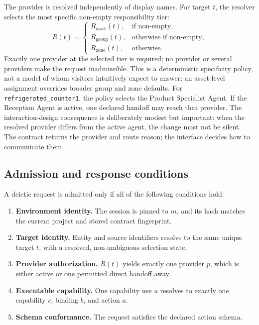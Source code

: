 The provider is resolved independently of display names.  For target \(t\), the
resolver selects the most specific non-empty responsibility tier:
\[
R(t) =
\begin{cases}
R_{\mathrm{asset}}(t), & \text{if non-empty},\\
R_{\mathrm{group}}(t), & \text{otherwise if non-empty},\\
R_{\mathrm{zone}}(t), & \text{otherwise}.
\end{cases}
\]
Exactly one provider at the selected tier is required; no provider or several
providers make the request inadmissible.  This is a deterministic specificity
policy, not a model of whom visitors intuitively expect to answer: an
asset-level assignment overrides broader group and zone defaults.  For
\texttt{refrigerated\_counter1}, the policy selects the Product Specialist
Agent.  If the Reception Agent is active, one declared handoff may reach that
provider.  The interaction-design consequence is deliberately modest but
important: when the resolved provider differs from the active agent, the change
must not be silent.  The contract returns the provider and route reason; the
interface decides how to communicate them.

\subsection{Admission and response conditions}

A deictic request is admitted only if all of the following conditions hold:

\begin{enumerate}
  \item \textbf{Environment identity.}  The session is pinned to \(m\), and its
  hash matches the current project and stored contract fingerprint.

  \item \textbf{Target identity.}  Entity and source identifiers resolve to the
  same unique target \(t\), with a resolved, non-ambiguous selection state.

  \item \textbf{Provider authorization.}  \(R(t)\) yields exactly one provider
  \(p\), which is either active or one permitted direct handoff away.

  \item \textbf{Executable capability.}  One capability use \(u\) resolves to
  exactly one capability \(c\), binding \(b\), and action \(a\).

  \item \textbf{Schema conformance.}  The request satisfies the declared action
  schema.
\end{enumerate}

